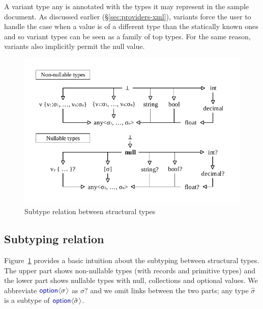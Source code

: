 \documentclass[10pt,preprint,blind,clearpagebib]{sigplanconf}
\newcommand{\langl}{\begin{picture}(4.5,7)
\put(1.1,2.5){\rotatebox{60}{\line(1,0){5.5}}}
\put(1.1,2.5){\rotatebox{300}{\line(1,0){5.5}}}
\end{picture}}
\newcommand{\rangl}{\begin{picture}(4.5,7)
\put(.9,2.5){\rotatebox{120}{\line(1,0){5.5}}}
\put(.9,2.5){\rotatebox{240}{\line(1,0){5.5}}}
\end{picture}}
\newcommand{\kvd}[1]{\textnormal{\textcolor{kvdclr}{\sffamily #1}}}
\begin{document}
A variant type \kvd{any} is annotated with the types it may represent in the sample document.
As discussed earlier (\S\ref{sec:providers-xml}), variants force the user to handle the case when 
a value is of a different type than the statically known ones and so variant types can be seen as a family of 
top types. For the same reason, variants also implicitly permit the \kvd{null} value. 


\begin{figure}
\begin{center}
\includegraphics[scale=0.80,trim=5mm 5mm 5mm 5mm,clip]{images/hierarchy.pdf} %
\end{center}
\vspace{-0.5em}
\caption{Subtype relation between structural types}
\label{fig:subtyping-diagram}
\vspace{-0.5em}
\end{figure}


\subsection{Subtyping relation}
\label{sec:inference-subtyping}

Figure~\ref{fig:subtyping-diagram} provides a basic intuition about the subtyping between
structural types. The upper part shows non-nullable types (with records and primitive types) and 
the lower part shows nullable types with \kvd{null}, collections and optional values. We 
abbreviate $\kvd{option}\langl\sigma\rangl$ as $\sigma?$ and we omit links between the two parts;
any type $\hat{\sigma}$ is a subtype of $\kvd{option}\langl\hat{\sigma}\rangl$.
\end{document}
